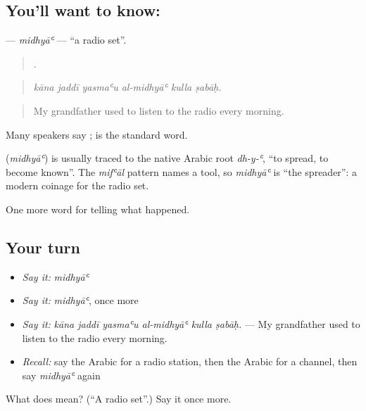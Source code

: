 \subsection*{You'll want to know: }
\textbf{} — \emph{midhyāʿ} — \textquotedblleft{}a radio set\textquotedblright{}.

\begin{quote}
     .
\end{quote}

\begin{quote}
\emph{kāna jaddī yasmaʿu al-midhyāʿ kulla ṣabāḥ.}
\end{quote}

\begin{quote}
My grandfather used to listen to the radio every morning.
\end{quote}

Many speakers say ;  is the standard word.

\begin{cousinweb}
\textbf{} (\emph{midhyāʿ}) is usually traced to the native Arabic root \emph{dh-y-ʿ}, \textquotedblleft{}to spread, to become known\textquotedblright{}. The \emph{mifʿāl} pattern names a tool, so \emph{midhyāʿ} is \textquotedblleft{}the spreader\textquotedblright{}: a modern coinage for the radio set.
\end{cousinweb}

\begin{grammarlens}[title={What you've built}]
One more word for telling what happened.
\end{grammarlens}

\subsection*{Your turn}
\begin{itemize}
\raggedright
  \item \emph{Say it:} \emph{midhyāʿ}
  \item \emph{Say it:} \emph{midhyāʿ}, once more
  \item \emph{Say it:} \emph{kāna jaddī yasmaʿu al-midhyāʿ kulla ṣabāḥ.} — My grandfather used to listen to the radio every morning.
  \item \emph{Recall:} say the Arabic for a radio station, then the Arabic for a channel, then say \emph{midhyāʿ} again
\end{itemize}

\begin{tcolorbox}[breakable,colback=teal!4,colframe=teal!35!black,title={Before you move on}]
What does  mean? (\textquotedblleft{}A radio set\textquotedblright{}.) Say it once more.
\end{tcolorbox}
